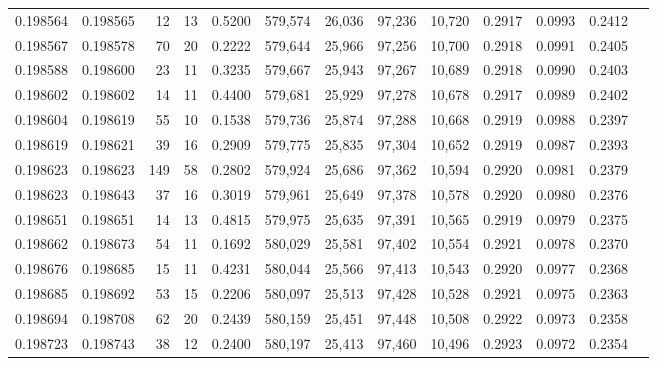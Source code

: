 \begin{tabular}{rrrrrrrrrrrrr}
0.198564 & 0.198565 &    12 &  13 &                                     0.5200 & 579,574 &  26,036 &  97,236 &  10,720 & 0.2917 & 0.0993 & 0.2412 \\
0.198567 & 0.198578 &    70 &  20 &                                     0.2222 & 579,644 &  25,966 &  97,256 &  10,700 & 0.2918 & 0.0991 & 0.2405 \\
0.198588 & 0.198600 &    23 &  11 &                                     0.3235 & 579,667 &  25,943 &  97,267 &  10,689 & 0.2918 & 0.0990 & 0.2403 \\
0.198602 & 0.198602 &    14 &  11 &                                     0.4400 & 579,681 &  25,929 &  97,278 &  10,678 & 0.2917 & 0.0989 & 0.2402 \\
0.198604 & 0.198619 &    55 &  10 &                                     0.1538 & 579,736 &  25,874 &  97,288 &  10,668 & 0.2919 & 0.0988 & 0.2397 \\
0.198619 & 0.198621 &    39 &  16 &                                     0.2909 & 579,775 &  25,835 &  97,304 &  10,652 & 0.2919 & 0.0987 & 0.2393 \\
0.198623 & 0.198623 &   149 &  58 &                                     0.2802 & 579,924 &  25,686 &  97,362 &  10,594 & 0.2920 & 0.0981 & 0.2379 \\
0.198623 & 0.198643 &    37 &  16 &                                     0.3019 & 579,961 &  25,649 &  97,378 &  10,578 & 0.2920 & 0.0980 & 0.2376 \\
0.198651 & 0.198651 &    14 &  13 &                                     0.4815 & 579,975 &  25,635 &  97,391 &  10,565 & 0.2919 & 0.0979 & 0.2375 \\
0.198662 & 0.198673 &    54 &  11 &                                     0.1692 & 580,029 &  25,581 &  97,402 &  10,554 & 0.2921 & 0.0978 & 0.2370 \\
0.198676 & 0.198685 &    15 &  11 &                                     0.4231 & 580,044 &  25,566 &  97,413 &  10,543 & 0.2920 & 0.0977 & 0.2368 \\
0.198685 & 0.198692 &    53 &  15 &                                     0.2206 & 580,097 &  25,513 &  97,428 &  10,528 & 0.2921 & 0.0975 & 0.2363 \\
0.198694 & 0.198708 &    62 &  20 &                                     0.2439 & 580,159 &  25,451 &  97,448 &  10,508 & 0.2922 & 0.0973 & 0.2358 \\
0.198723 & 0.198743 &    38 &  12 &                                     0.2400 & 580,197 &  25,413 &  97,460 &  10,496 & 0.2923 & 0.0972 & 0.2354 \\

\end{tabular}
